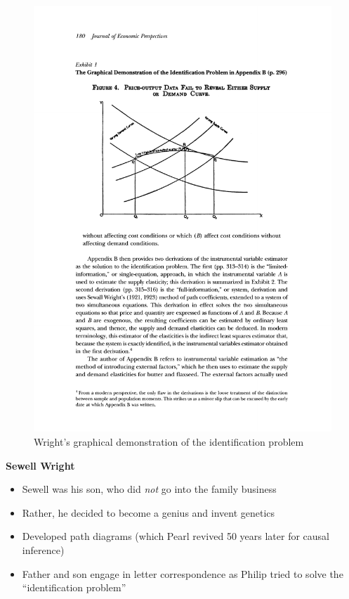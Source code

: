 \documentclass[notes=show]{beamer}
\begin{document}
\begin{frame}[plain]

 \begin{figure}[h]
\includegraphics[scale=0.75]{./lecture_includes/supply_demand.pdf}
\caption{Wright's graphical demonstration of the identification problem}
\label{fig:sd}
\end{figure}

\end{frame}

\begin{frame}[plain]
\begin{center}
\textbf{Sewell Wright}
\end{center}

\begin{itemize}
\item Sewell was his son, who did \emph{not} go into the family business
\item Rather, he decided to become a genius and invent genetics
\item Developed path diagrams (which Pearl revived 50 years later for causal inference) 
\item Father and son engage in letter correspondence as Philip tried to solve the ``identification problem''

\end{itemize}

\end{frame}
\end{document}
